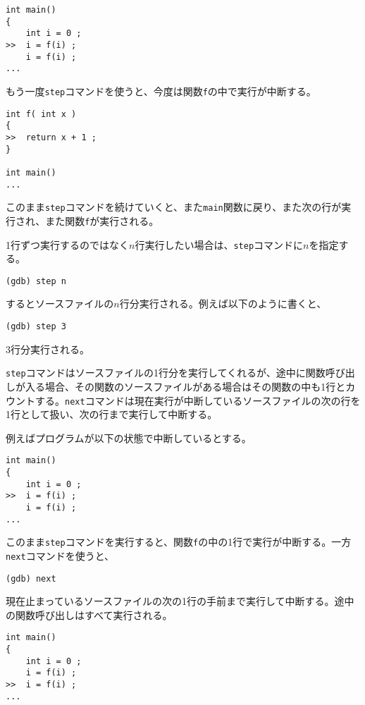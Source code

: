 \begin{lstlisting}[style=terminal]
int main()
{
    int i = 0 ;
>>  i = f(i) ;
    i = f(i) ;
...
\end{lstlisting}

もう一度\texttt{step}コマンドを使うと、今度は関数\texttt{f}の中で実行が中断する。

\begin{lstlisting}[style=terminal]
int f( int x )
{
>>  return x + 1 ;
}

int main()
...
\end{lstlisting}

このまま\texttt{step}コマンドを続けていくと、また\texttt{main}関数に戻り、また次の行が実行され、また関数\texttt{f}が実行される。

1行ずつ実行するのではなく\(n\)行実行したい場合は、\texttt{step}コマンドに\(n\)を指定する。

\begin{lstlisting}[style=terminal]
(gdb) step n
\end{lstlisting}

するとソースファイルの\(n\)行分実行される。例えば以下のように書くと、
\begin{lstlisting}[style=terminal]
(gdb) step 3
\end{lstlisting}
3行分実行される。


\texttt{step}コマンドはソースファイルの1行分を実行してくれるが、途中に関数呼び出しが入る場合、その関数のソースファイルがある場合はその関数の中も1行とカウントする。\texttt{next}コマンドは現在実行が中断しているソースファイルの次の行を1行として扱い、次の行まで実行して中断する。

例えばプログラムが以下の状態で中断しているとする。

\ifTombow\enlargethispage{3mm}\fi
\begin{lstlisting}[style=terminal]
int main()
{
    int i = 0 ;
>>  i = f(i) ;
    i = f(i) ;
...
\end{lstlisting}

このまま\texttt{step}コマンドを実行すると、関数\texttt{f}の中の1行で実行が中断する。一方\texttt{next}コマンドを使うと、
\begin{lstlisting}[style=terminal]
(gdb) next
\end{lstlisting}
現在止まっているソースファイルの次の1行の手前まで実行して中断する。途中の関数呼び出しはすべて実行される。

\begin{lstlisting}[style=terminal]
int main()
{
    int i = 0 ;
    i = f(i) ;
>>  i = f(i) ;
...
\end{lstlisting}

